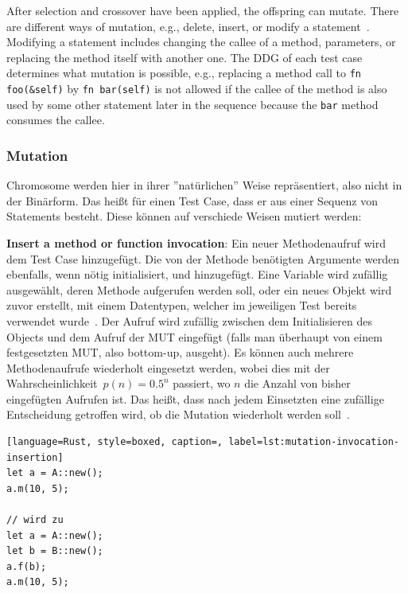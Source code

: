 \documentclass{article}
\begin{document}
After selection and crossover have been applied, the offspring can mutate. There are different ways of mutation, e.g., delete, insert, or modify a statement~\cite{Fraser2012}. Modifying a statement includes changing the callee of a method, parameters, or replacing the method itself with another one. The \ac{DDG} of each test case determines what mutation is possible, e.g., replacing a method call to \lstinline{fn foo(&self)} by \lstinline{fn bar(self)} is not allowed if the callee of the method is also used by some other statement later in the sequence because the \lstinline{bar} method consumes the callee. 

\subsubsection{Mutation}
Chromosome werden hier in ihrer ''natürlichen'' Weise repräsentiert, also nicht in der Binärform. Das heißt für einen Test Case, dass er aus einer Sequenz von Statements besteht. Diese können auf verschiede Weisen mutiert werden: 

\textbf{Insert a method or function invocation}: Ein neuer Methodenaufruf wird dem Test Case hinzugefügt. Die von der Methode benötigten Argumente werden ebenfalls, wenn nötig initialisiert, und hinzugefügt. Eine Variable wird zufällig ausgewählt, deren Methode aufgerufen werden soll, oder ein neues Objekt wird zuvor erstellt, mit einem Datentypen, welcher im jeweiligen Test bereits verwendet wurde~\cite{Fraser2012}. Der Aufruf wird zufällig zwischen dem Initialisieren des Objects und dem Aufruf der \ac{MUT} eingefügt (falls man überhaupt von einem festgesetzten MUT, also bottom-up, ausgeht). Es können auch mehrere Methodenaufrufe wiederholt eingesetzt werden, wobei dies mit der Wahrscheinlichkeit~$p(n) = 0.5^n$ passiert, wo $n$ die Anzahl von bisher eingefügten Aufrufen ist. Das heißt, dass nach jedem Einsetzten eine zufällige Entscheidung getroffen wird, ob die Mutation wiederholt werden soll~\cite{Tonella2004}.
\begin{lstlisting}[language=Rust, style=boxed, caption=, label=lst:mutation-invocation-insertion]
let a = A::new();
a.m(10, 5);

// wird zu 
let a = A::new();
let b = B::new();
a.f(b);
a.m(10, 5);
\end{lstlisting}
\end{document}
